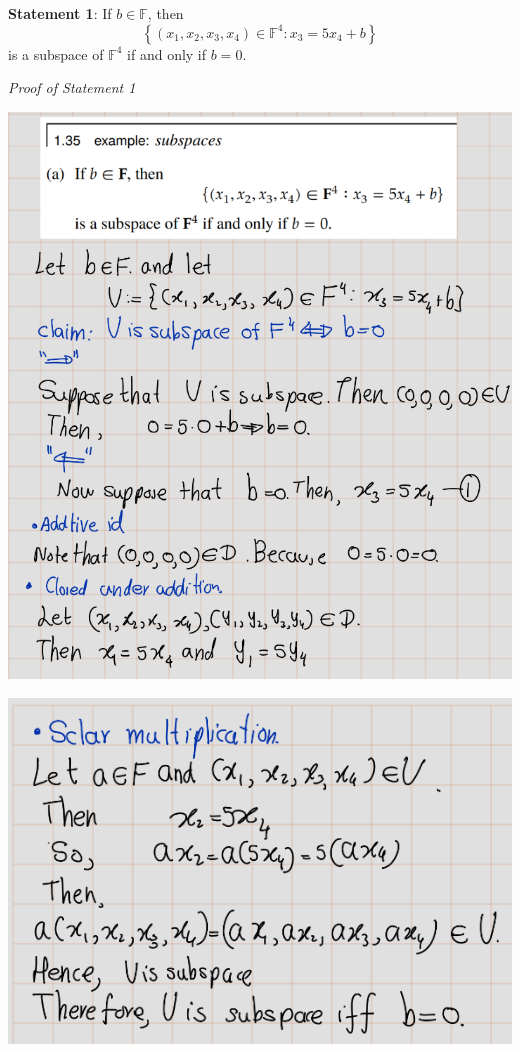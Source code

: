 \documentclass[
]{book}
\theoremstyle{definition}
\theoremstyle{definition}
\theoremstyle{definition}
\theoremstyle{definition}
\theoremstyle{remark}
\begin{document}
\textbf{Statement 1}: If \(b\in \mathbb{F}\), then
\[\left\{(x_1,x_2,x_3,x_4)\in \mathbb{F}^4:x_3=5x_4+b\right\}\]
is a subspace of \(\mathbb{F}^4\) if and only if \(b = 0\).

\emph{Proof of Statement 1}

\includegraphics[width=9.96in]{fig/Ex1C/Ex2-a-1}

\includegraphics[width=8.01in]{fig/Ex1C/Ex2-a-2}
\end{document}
